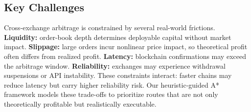 \subsection{Key Challenges}

Cross-exchange arbitrage is constrained by several real-world frictions.
\textbf{Liquidity:} order-book depth determines deployable capital without market impact.
\textbf{Slippage:} large orders incur nonlinear price impact, so theoretical profit often differs from realized profit.
\textbf{Latency:} blockchain confirmations may exceed the arbitrage window.
\textbf{Reliability:} exchanges may experience withdrawal suspensions or API instability.
These constraints interact: faster chains may reduce latency but carry higher reliability risk. Our heuristic-guided A* framework models these trade-offs to prioritize routes that are not only theoretically profitable but realistically executable.
